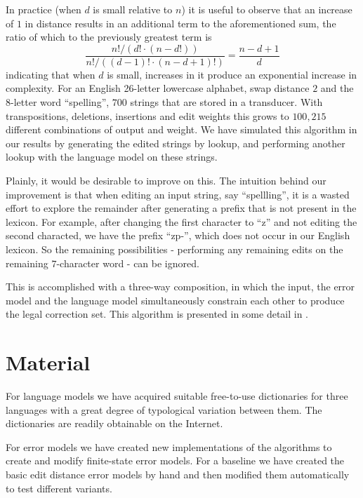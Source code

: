 \documentclass[11pt]{article}
\begin{document}
In practice
(when $d$ is small relative to $n$) it is useful to observe that an
increase of $1$ in distance results
in an additional term to the aforementioned sum,
the ratio of which to the previously greatest term is
\begin{displaymath}
\frac{n!/(d!\cdot(n-d!))}{n!/((d-1)!\cdot(n-d+1)!)} = \frac{n-d+1}{d}
\end{displaymath}
indicating that when $d$ is small, increases in it produce an
exponential increase in complexity.
For an English 26-letter lowercase alphabet, swap
distance $2$ and the $8$-letter word ``spelling'', $700$ strings that are
stored in a transducer. With transpositions, deletions, insertions and edit
weights this grows to $100,215$ different combinations of output and weight. We
have simulated this algorithm in our results by generating the edited strings
by lookup, and performing another lookup with the language model on these
strings.

Plainly, it would be desirable to improve on this. The intuition behind our
improvement is that when editing an input string, say ``spellling'', it is a
wasted effort to explore the remainder after generating a prefix that is not
present in the lexicon. For example, after changing the first character to ``z''
and not editing the second characted, we have the prefix \mbox{``zp-''}, which does
not occur in our English lexicon. So the remaining possibilities - performing
any remaining edits on the remaining $7$-character word - can be ignored.

This is accomplished with a three-way composition, in which the input, the
error model and the language model simultaneously constrain each other to
produce the legal correction set. This algorithm is presented in some detail
in .

\section{Material}
\label{sec:materials}

For language models we have acquired suitable free-to-use
dictionaries for three languages with a great degree of
typological variation between them. The dictionaries
are readily obtainable on the Internet.

For error models we have created new implementations of the algorithms
to create and modify finite-state error models. For a baseline we have created
the basic edit distance error models by hand and then modified them
automatically to test different variants.
\end{document}
